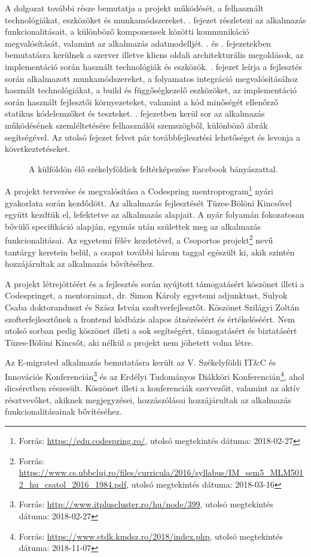 A dolgozat további része bemutatja a projekt működését, a felhasznált technológiákat, eszközöket és munkamódszereket.  . fejezet részletezi az alkalmazás funkcionalitásait, a különböző komponensek közötti kommunikáció megvalósítását, valamint az alkalmazás adatmodelljét.  . és . fejezetekben bemutatásra kerülnek a szerver illetve kliens oldali architekturális megoldások, az implementáció során használt technológiák és eszközök. . fejezet leírja a fejlesztés során alkalmazott munkamódszereket,  a folyamatos integráció megvalósításához használt technológiákat, a build és függőségkezelő eszközöket, az implementáció során használt fejlesztői környezeteket, valamint a kód minőségét ellenőrző statikus kódelemzőket és teszteket. . fejezetben kerül sor az alkalmazás működésének szemléltetésére felhasználói szemszögből, különböző ábrák segítségével. Az utolsó fejezet felvet pár továbbfejlesztési lehetőséget és levonja a következtetéseket. 
\begin{figure}
  \centering
  \caption{A külföldön élő székelyföldiek feltérképezése Facebook bányászattal.}
  \label{fig:szekely_diaszpora}
\end{figure}

A projekt tervezése és megvalósítása a Codespring mentroprogram\footnote{Forrás: \url{https://edu.codespring.ro/}, utolsó megtekintés dátuma: 2018-02-27} nyári gyakorlata során kezdődött. Az alkalmazás fejlesztését Tüzes-Bölöni Kincsővel együtt kezdtük el, lefektetve az alkalmazás alapjait. A nyár folyamán fokozatosan bővülő specifikáció alapján, egymás után születtek meg az alkalmazás funkcionalitásai. Az egyetemi félév kezdetével, a Csoportos projekt\footnote{Forrás: \url{https://www.cs.ubbcluj.ro/files/curricula/2016/syllabus/IM_sem5_MLM5012_hu_csatol_2016_1984.pdf}, utolsó megtekintés dátuma: 2018-03-16} nevű tantárgy keretein belül, a csapat további három taggal egészült ki, akik szintén hozzájárultak az alkalmazás bővítéséhez. 

A projekt létrejöttéért és a fejlesztés során nyújtott támogatásért köszönet illeti a Codespringet, a mentoraimat, dr. Simon Károly egyetemi adjunktust, Sulyok Csaba doktoranduszt és Szász István szoftverfejlesztőt. Köszönet Szilágyi Zoltán szofterfejlesztőnek a frontend kódbázis alapos átnézéséért és értékeléséért. Nem utolsó sorban pedig köszönet illeti a sok segítségért, támogatásért és biztatásért Tüzes-Bölöni Kincsőt, aki nélkül a projekt nem jöhetett volna létre. 

Az E-migrated alkalmazás bemutatásra került az V. Székelyföldi IT\&C és Innovációs Konferencián\footnote{Forrás: \url{http://www.itpluscluster.ro/hu/node/399}, utolsó megtekintés dátuma: 2018-02-27} és az Erdélyi Tudományos Diákköri Konferencián\footnote{Forrás: \url{https://www.etdk.kmdsz.ro/2018/index.php}, utolsó megtekintés dátuma: 2018-11-07}, ahol dicséretben részesült. Köszönet illeti a konferenciák szervezőit, valamint az aktív résztvevőket, akiknek megjegyzései, hozzászólásai hozzájárultak az alkalmazás funkcionalitásainak bővítéséhez. 


